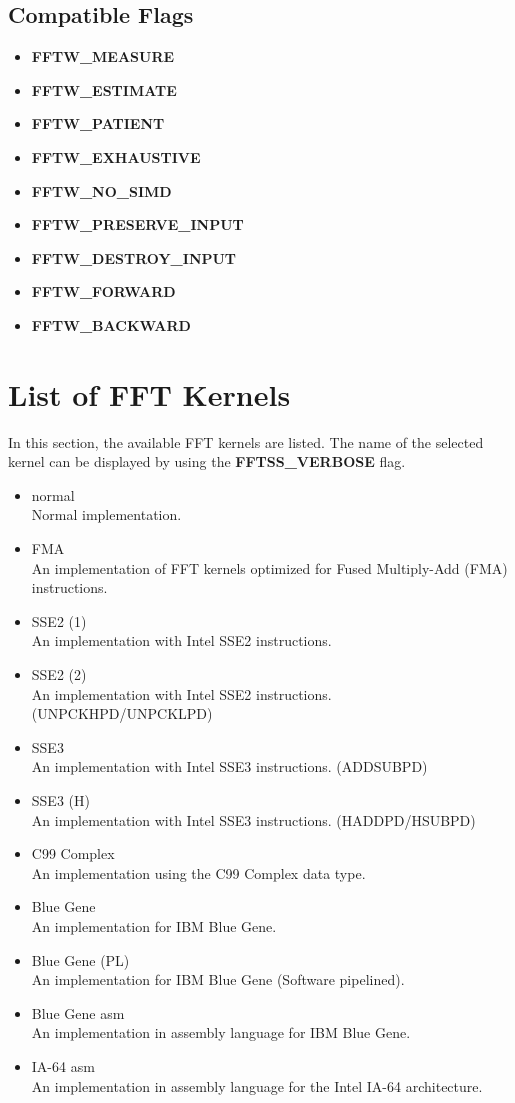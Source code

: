 \documentclass{article}
\begin{document}
\subsection{Compatible Flags}
\begin{itemize}
\item{\bf FFTW\_MEASURE}
\item{\bf FFTW\_ESTIMATE}
\item{\bf FFTW\_PATIENT}
\item{\bf FFTW\_EXHAUSTIVE}
\item{\bf FFTW\_NO\_SIMD}
\item{\bf FFTW\_PRESERVE\_INPUT}
\item{\bf FFTW\_DESTROY\_INPUT}
\item{\bf FFTW\_FORWARD}
\item{\bf FFTW\_BACKWARD}
\end{itemize}

\section{List of FFT Kernels}
In this section, the available FFT kernels are listed.
The name of the selected kernel 
can be displayed by using the {\bf FFTSS\_VERBOSE} flag.
\begin{itemize}
\item{normal}\\
Normal implementation.
\item{FMA}\\
An implementation of FFT kernels optimized for Fused Multiply-Add (FMA)
 instructions.
\item{SSE2 (1)}\\
An implementation with Intel SSE2 instructions.
\item{SSE2 (2)}\\
An implementation with Intel SSE2 instructions. (UNPCKHPD/UNPCKLPD)
\item{SSE3}\\
An implementation with Intel SSE3 instructions. (ADDSUBPD)
\item{SSE3 (H)}\\
An implementation with Intel SSE3 instructions. (HADDPD/HSUBPD)
\item{C99 Complex}\\
An implementation using the C99 Complex data type.
\item{Blue Gene}\\
An implementation for IBM Blue Gene.
\item{Blue Gene (PL)}\\
An implementation for IBM Blue Gene (Software pipelined).
\item{Blue Gene asm}\\
An implementation in assembly language for IBM Blue Gene.
\item{IA-64 asm}\\
An implementation in assembly language for the Intel IA-64 architecture.
\end{itemize}
\end{document}
